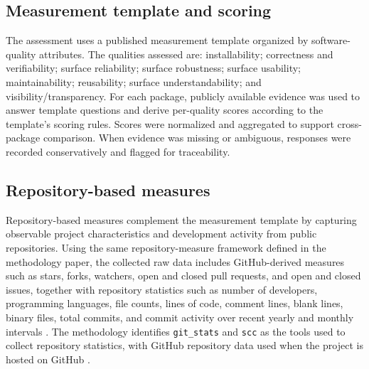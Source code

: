 \documentclass[final,1p,times,authoryear,12pt]{elsarticle}
\providecommand{\wss}[1]{\textcolor{blue}{\textit{#1}}}
\begin{document}
\subsection{Measurement template and scoring}\label{template}

The assessment uses a published measurement template organized by software-quality attributes.
The qualities assessed are: installability; correctness and verifiability; surface reliability; surface robustness; surface usability;
 maintainability; reusability; surface understandability; and visibility/transparency.
 For each package, publicly available evidence was used to answer template questions and derive per-quality scores according
 to the template’s scoring rules. Scores were normalized and aggregated to support cross-package comparison.
  When evidence was missing or ambiguous, responses were recorded conservatively and flagged for traceability.

\subsection{Repository-based measures}\label{metrics}

Repository-based measures complement the measurement template
by capturing observable project characteristics and
development activity from public repositories. Using the same
repository-measure framework defined in the methodology
paper, the collected raw data includes GitHub-derived
measures such as stars, forks, watchers, open and closed
pull requests, and open and closed issues, together with
repository statistics such as number of developers,
programming languages, file counts, lines of code, comment
lines, blank lines, binary files, total commits, and commit
activity over recent yearly and monthly intervals
\cite{MethodologyPaper}. The methodology identifies
\texttt{git\_stats} and \texttt{scc} as the tools used to
collect repository statistics, with GitHub repository data
used when the project is hosted on GitHub
\cite{MethodologyPaper}.
\end{document}
